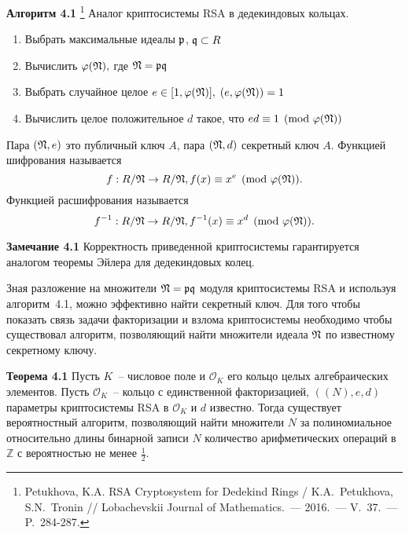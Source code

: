 \documentclass[_00_autoref.tex]{subfiles}
\begin{document}
\textbf{Алгоритм 4.1}\label{algorithm:RSA_in_dedekind} \footnote{\small Petukhova, K.A. RSA Cryptosystem for Dedekind Rings / K.A.~Petukhova, S.N.~Tronin // Lobachevskii Journal of Mathematics.~--- 2016.~--- V.~37.~--- P.~284-287.}
    Аналог криптосистемы RSA в дедекиндовых кольцах.

    \begin{enumerate}
        \item Выбрать максимальные идеалы $\mathfrak{p}$, $\mathfrak{q} \subset R$

        \item Вычислить $\varphi(\mathfrak{N}),$ где $\mathfrak{N} = \mathfrak{p} \mathfrak{q}$

        \item Выбрать случайное целое $e \in [1, \varphi(\mathfrak{N})],$ $(e, \varphi(\mathfrak{N}))=1$

        \item Вычислить целое положительное $d$ такое, что $ed \equiv 1 \pmod{\varphi(\mathfrak{N})}$
    \end{enumerate}

    Пара $(\mathfrak{N}, e)$ это публичный ключ $A$, пара $(\mathfrak{N}, d)$ секретный ключ $A$.
    Функцией шифрования называется
    \begin{equation*}
        f: R/\mathfrak{N} \to R/\mathfrak{N}, f(x) \equiv x^{e} \pmod{\varphi(\mathfrak{N})}.
    \end{equation*}
    Функцией расшифрования называется
    \begin{equation*}
        f^{-1}: R/\mathfrak{N} \to R/\mathfrak{N}, f^{-1}(x) \equiv x^{d}\pmod{\varphi(\mathfrak{N})}.
    \end{equation*}

\textbf{Замечание 4.1}
    Корректность приведенной криптосистемы гарантируется аналогом теоремы Эйлера для дедекиндовых колец.


Зная разложение на множители $\mathfrak{N} = \mathfrak{p}\mathfrak{q}$ модуля криптосистемы RSA и используя алгоритм~4.1, можно эффективно найти секретный ключ.
Для того чтобы показать связь задачи факторизации и взлома криптосистемы необходимо чтобы существовал алгоритм, позволяющий найти множители идеала $\mathfrak{N}$ по известному секретному ключу.

\textbf{Теорема 4.1}\label{theorem:factor}
    Пусть $K$~-- числовое поле и $\mathcal{O}_K$ его кольцо целых алгебраических элементов.
    Пусть $\mathcal{O}_K$~-- кольцо с единственной факторизацией, $((N), e, d)$ параметры криптосистемы RSA в $\mathcal{O}_K$ и $d$ известно.
    Тогда существует вероятностный алгоритм, позволяющий найти множители $N$ за полиномиальное относительно длины бинарной записи $N$ количество арифметических операций в $\mathbb{Z}$ с вероятностью не менее $\frac{1}{2}$.
\end{document}
